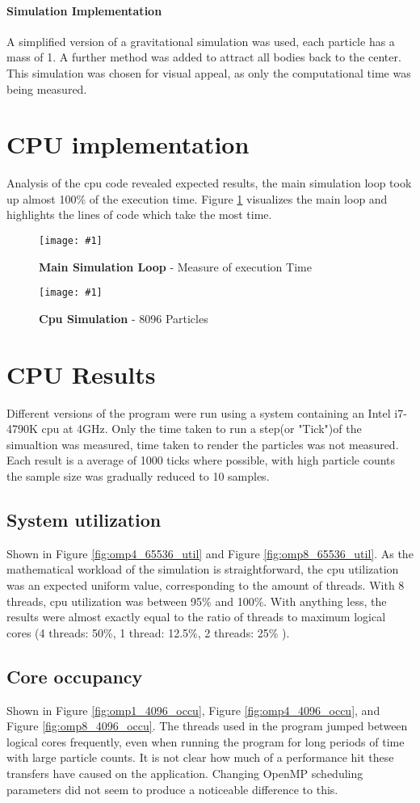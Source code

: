 \documentclass[conference]{acmsiggraph}
\newcommand{\figuremacroW}[4]{
	\begin{figure}[h] %
		\centering
		\texttt{[image: \#1]}
		\caption[#2]{\textbf{#2} - #3}
		\label{fig:#1}
	\end{figure}
}
\begin{document}
\paragraph{Simulation Implementation}
A simplified version of a gravitational simulation was used, each particle has a mass of 1. A further method was added to attract all bodies back to the center. This simulation was chosen for visual appeal, as only the computational time was being measured.

\section{CPU implementation}
Analysis of the cpu code revealed expected results, the main simulation loop took up almost 100\% of the execution time. Figure \ref{fig:HotCode} visualizes the main loop and highlights the lines of code which take the most time.

\figuremacroW
{HotCode}
{Main Simulation Loop}
{Measure of execution Time}
{0.95}

\figuremacroW
{cpusim}
{Cpu Simulation}
{8096 Particles}
{0.95}

\section{CPU Results}
Different versions of the program were run using a system containing an Intel i7-4790K cpu at 4GHz. Only the time taken to run a step(or "Tick")of the simualtion was measured, time taken to render the particles was not measured. Each result is a average of 1000 ticks where possible, with high particle counts the sample size was gradually reduced to 10 samples.

\subsection{System utilization}
Shown in Figure \ref{fig:omp4_65536_util} and Figure \ref{fig:omp8_65536_util}.
As the mathematical workload of the simulation is straightforward, the cpu utilization was an expected uniform value, corresponding to the amount of threads. With 8 threads, cpu utilization was between 95\% and 100\%. With anything less, the results were almost exactly equal to the ratio of threads to maximum logical cores (4 threads: 50\%, 1 thread: 12.5\%, 2 threads: 25\% ).

\subsection{Core occupancy}
Shown in Figure \ref{fig:omp1_4096_occu}, Figure \ref{fig:omp4_4096_occu}, and Figure \ref{fig:omp8_4096_occu}.
The threads used in the program jumped between logical cores frequently, even when running the program for long periods of time with large particle counts. It is not clear how much of a performance hit these transfers have caused on the application. Changing OpenMP scheduling parameters did not seem to produce a noticeable difference to this.
\end{document}

